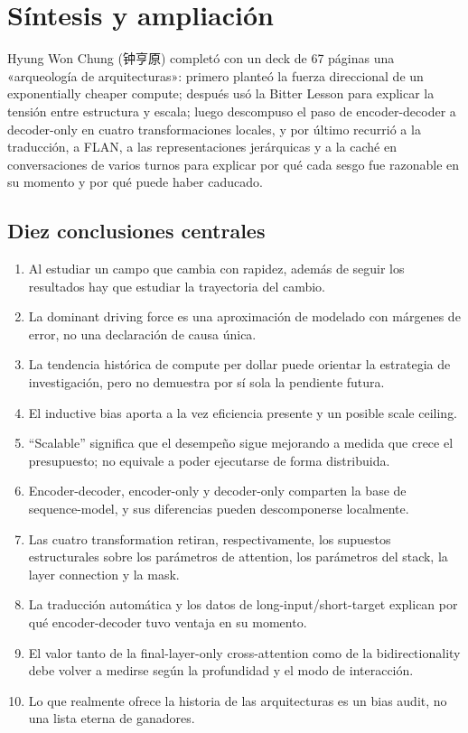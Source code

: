 \section{Síntesis y ampliación}

Hyung Won Chung (钟亨原) completó con un deck de 67 páginas una «arqueología de arquitecturas»: primero planteó la fuerza direccional de un exponentially cheaper compute; después usó la Bitter Lesson para explicar la tensión entre estructura y escala; luego descompuso el paso de encoder-decoder a decoder-only en cuatro transformaciones locales, y por último recurrió a la traducción, a FLAN, a las representaciones jerárquicas y a la caché en conversaciones de varios turnos para explicar por qué cada sesgo fue razonable en su momento y por qué puede haber caducado.

\subsection{Diez conclusiones centrales}

\begin{enumerate}
  \item Al estudiar un campo que cambia con rapidez, además de seguir los resultados hay que estudiar la trayectoria del cambio.
  \item La dominant driving force es una aproximación de modelado con márgenes de error, no una declaración de causa única.
  \item La tendencia histórica de compute per dollar puede orientar la estrategia de investigación, pero no demuestra por sí sola la pendiente futura.
  \item El inductive bias aporta a la vez eficiencia presente y un posible scale ceiling.
  \item ``Scalable'' significa que el desempeño sigue mejorando a medida que crece el presupuesto; no equivale a poder ejecutarse de forma distribuida.
  \item Encoder-decoder, encoder-only y decoder-only comparten la base de sequence-model, y sus diferencias pueden descomponerse localmente.
  \item Las cuatro transformation retiran, respectivamente, los supuestos estructurales sobre los parámetros de attention, los parámetros del stack, la layer connection y la mask.
  \item La traducción automática y los datos de long-input/short-target explican por qué encoder-decoder tuvo ventaja en su momento.
  \item El valor tanto de la final-layer-only cross-attention como de la bidirectionality debe volver a medirse según la profundidad y el modo de interacción.
  \item Lo que realmente ofrece la historia de las arquitecturas es un bias audit, no una lista eterna de ganadores.
\end{enumerate}

